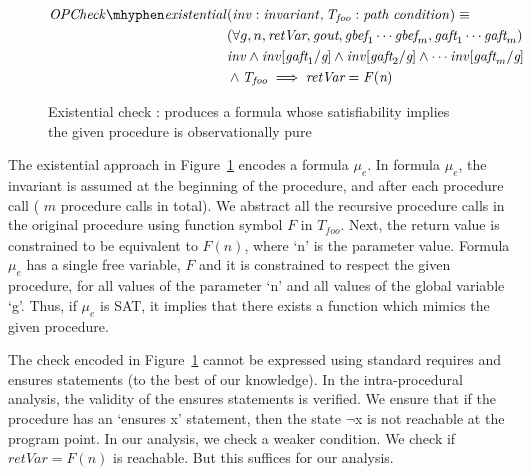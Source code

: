 \documentclass{llncs}
\newcommand{\foo}{\textit{foo}}
\newcommand{\inv}{\mathit{inv}}
\newcommand{\pathCondition}{\mathit{T_{\foo}}}
\newcommand{\OPCheckE}{\mathit{OPCheck \mhyphen existential}}
\newcommand{\mi}[1]{\mathit{#1}}
\newcommand{\retVar}{\textit{retVar}}
\newcommand{\F}{\mathit{F}}
\newcommand{\n}{\textit{n}}
\newcommand{\g}{\textit{g}}
\newcommand{\gout}{\textit{gout}}
\newcommand{\gbef}{\textit{gbef}}
\newcommand{\gaft}{\textit{gaft}}
\newcommand{\formula}{\mu}
\begin{document}
\begin{figure}[htp]
  \begin{algorithm}[H]
    \begin{align*}
      \OPCheckE
       & \mi{(\inv :
        invariant, \pathCondition : path \; condition)} \equiv \\
      & (\forall g, n, \retVar, \gout, \gbef_1 \cdots \gbef_m, \gaft_1
      \cdots \gaft_m)\\
      &\inv \wedge \inv[\gaft_1/\g] \wedge \inv[\gaft_2/\g] \wedge
      \cdots \inv[\gaft_m/\g] \\
      &\wedge \pathCondition \implies \retVar = \F(\n)\\
    \end{align*}
    \caption{Existential check : produces a formula whose
      satisfiability implies the given procedure is observationally
      pure} 
    \label{algo:someOPcheckCombined}
  \end{algorithm}  
\end{figure}

The existential approach in Figure~\ref{algo:someOPcheckCombined}
encodes a formula $\formula_e$. In formula $\formula_e$, the invariant
is assumed at the beginning of the procedure, and after each procedure
call ( $m$ procedure calls in total).  We abstract all the recursive
procedure calls in the original procedure using function symbol $\F$
in $\pathCondition$.  Next, the return value is constrained to be
equivalent to $\F(n)$, where `n' is the parameter value. Formula
$\formula_e$ has a single free variable, $\F$ and it is
constrained to respect the given procedure,
for all values of the parameter
`n' and all values of the global variable `g'.
Thus, if $\formula_e$ is SAT, it implies that there exists a function
which mimics the given procedure.

The check encoded in Figure~\ref{algo:someOPcheckCombined} cannot be
expressed using standard requires and ensures statements (to the best
of our knowledge). In the intra-procedural analysis, the validity of
the ensures statements is verified. We ensure that if the procedure
has an `ensures x' statement, then the state $\neg$x is not reachable
at the program point.
In our analysis, we check
a weaker condition. We check if $\retVar = \F(n)$ is reachable. But
this suffices for our analysis.
\end{document}
